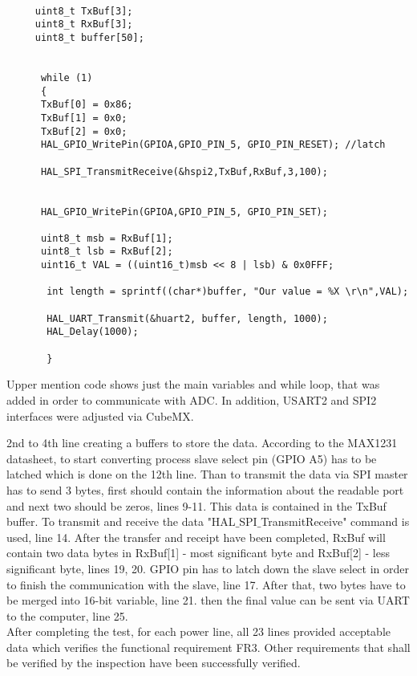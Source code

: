 	
	 \begin{lstlisting}

	 uint8_t TxBuf[3];
	 uint8_t RxBuf[3];
	 uint8_t buffer[50];
	

	  while (1)
	  {
	  TxBuf[0] = 0x86;
	  TxBuf[1] = 0x0;
	  TxBuf[2] = 0x0;
	  HAL_GPIO_WritePin(GPIOA,GPIO_PIN_5, GPIO_PIN_RESET); //latch 
	  
	  HAL_SPI_TransmitReceive(&hspi2,TxBuf,RxBuf,3,100);
	  
	  
	  HAL_GPIO_WritePin(GPIOA,GPIO_PIN_5, GPIO_PIN_SET);
	  
	  uint8_t msb = RxBuf[1];
	  uint8_t lsb = RxBuf[2];
	  uint16_t VAL = ((uint16_t)msb << 8 | lsb) & 0x0FFF;
	  
	   int length = sprintf((char*)buffer, "Our value = %X \r\n",VAL);
	   
	   HAL_UART_Transmit(&huart2, buffer, length, 1000);
	   HAL_Delay(1000);
	   
	   }
	 \end{lstlisting}
	 
	 Upper mention code shows just the main variables and while loop, that was added in order to communicate with ADC. In addition, USART2 and SPI2 interfaces were adjusted via CubeMX.
	 
	 2nd to 4th line creating a buffers to store the data. According to the MAX1231 datasheet, to start converting process slave select pin (GPIO A5) has to be latched which is done on the 12th line.
	 Than to transmit the data via SPI master has to send 3 bytes, first should contain the information about the readable port and next two should be zeros, lines 9-11. This data is contained in the TxBuf buffer. To transmit and receive the data "HAL$\_$SPI$\_$TransmitReceive" command is used, line 14. After the transfer and receipt have been completed, RxBuf will contain two data bytes in RxBuf[1] - most significant byte and RxBuf[2] - less significant byte, lines 19, 20. GPIO pin has to latch down the slave select in order to finish the communication with the slave, line 17. After that, two bytes have to be merged into 16-bit variable, line 21. then the final value can be sent via UART to the computer, line 25.\\
	 After completing the test, for each power line, all 23 lines provided acceptable data which verifies the functional requirement FR3. Other requirements that shall be verified by the inspection have been successfully verified.
	 
	 
	 
		